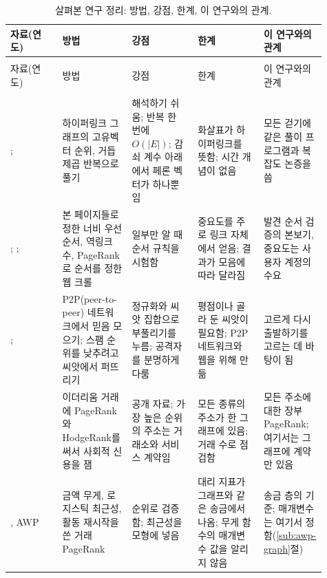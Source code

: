 {\footnotesize{}\renewcommand{\arraystretch}{1.3}%
\setlength{\tabcolsep}{4pt}
\begin{longtable}{>{\raggedright\arraybackslash}p{0.15\linewidth}>{\raggedright\arraybackslash}p{0.20\linewidth}>{\raggedright\arraybackslash}p{0.19\linewidth}>{\raggedright\arraybackslash}p{0.19\linewidth}>{\raggedright\arraybackslash}p{0.18\linewidth}}
\caption{살펴본 연구 정리: 방법, 강점, 한계, 이 연구와의 관계.}
\label{tab:literature-summary}\\
\toprule
자료(연도) & 방법 & 강점 & 한계 & 이 연구와의 관계 \\
\midrule
\endfirsthead
\multicolumn{5}{l}{\small 표~\thetable\ (이어짐)}\\
\toprule
자료(연도) & 방법 & 강점 & 한계 & 이 연구와의 관계 \\
\midrule
\endhead
\midrule
\multicolumn{5}{r}{\small 다음 쪽에 이어짐}\\
\endfoot
\bottomrule
\endlastfoot
\textcite{page1999pagerank}; \textcite{langville2006pagerank} & 하이퍼링크 그래프의 고유벡터 순위, 거듭제곱 반복으로 풀기 & 해석하기 쉬움; 반복 한 번에 $O(|E|)$; 감쇠 계수 아래에서 페론 벡터가 하나뿐임 & 화살표가 하이퍼링크를 뜻함; 시간 개념이 없음 & 모든 걷기에 같은 풀이 프로그램과 복잡도 논증을 씀 \\
\textcite{cho1998crawling}; \textcite{najork2001breadth}; \textcite{baezayates2005crawling} & 본 페이지들로 정한 너비 우선 순서, 역링크 수, PageRank로 순서를 정한 웹 크롤 & 일부만 알 때 순서 규칙을 시험함 & 중요도를 주로 링크 자체에서 얻음; 결과가 모음에 따라 달라짐 & 발견 순서 검증의 본보기, 중요도는 사용자 계정의 수요 \\
\textcite{kamvar2003eigentrust}; \textcite{gyongyi2004trustrank} & P2P(peer-to-peer) 네트워크에서 믿음 모으기; 스팸 순위를 낮추려고 씨앗에서 퍼뜨리기 & 정규화와 씨앗 집합으로 부풀리기를 누름; 공격자를 분명하게 다룸 & 평점이나 골라 둔 씨앗이 필요함; P2P 네트워크와 웹을 위해 만듦 & 고르게 다시 출발하기를 고르는 데 바탕이 됨 \\
\textcite{do2023hodgerank} & 이더리움 거래에 PageRank와 HodgeRank를 써서 사회적 신용을 잼 & 공개 자료; 가장 높은 순위의 주소는 거래소와 서비스 계약임 & 모든 종류의 주소가 한 그래프에 있음; 거래 수로 점검함 & 모든 주소에 대한 장부 PageRank; 여기서는 그래프에 계약만 있음 \\
\textcite{do2023awp}, AWP & 금액 무게, 로지스틱 최근성, 활동 재시작을 쓴 거래 PageRank & 순위로 검증함; 최근성을 모형에 넣음 & 대리 지표가 그래프와 같은 송금에서 나옴; 무게 함수의 매개변수 값을 알리지 않음 & 송금 층의 기준; 매개변수는 여기서 정함(\ref{sub:awp-graph}절) \\

\end{longtable}}
